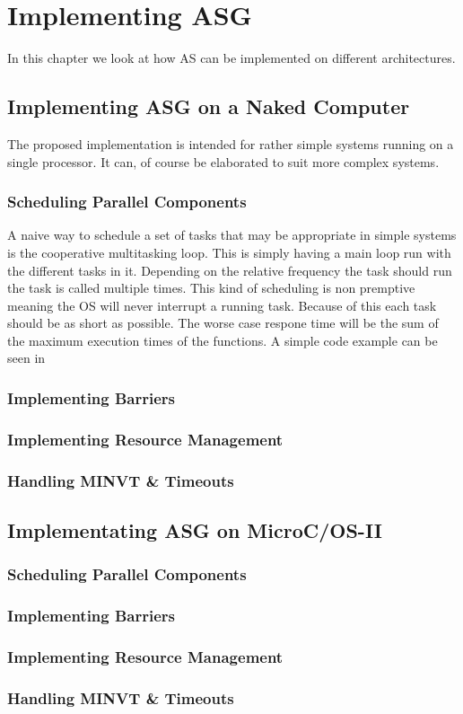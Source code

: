 \documentclass[../main.tex]{subfiles}
\begin{document}
\chapter{Implementing ASG}
In this chapter we look at how AS can be implemented on different architectures.

\section{Implementing ASG on a Naked Computer}
The proposed implementation is intended for rather simple systems running on a single processor. It can, of course be elaborated to suit more complex systems.
\subsection{Scheduling Parallel Components}
A naive way to schedule a set of tasks that may be appropriate in simple systems is the cooperative multitasking loop.
This is simply having a main loop run with the different tasks in it.
Depending on the relative frequency the task should run the task is called multiple times.
This kind of scheduling is non premptive meaning the OS will never interrupt a running task.
Because of this each task should be as short as possible.
The worse case respone time will be the sum of the maximum execution times of the functions.
A simple code example can be seen in 

%


\subsection{Implementing Barriers}
\subsection{Implementing Resource Management}
\subsection{Handling MINVT \& Timeouts}

\section{Implementating ASG on MicroC/OS-II}

\subsection{Scheduling Parallel Components}
\subsection{Implementing Barriers}
\subsection{Implementing Resource Management}
\subsection{Handling MINVT \& Timeouts}
\end{document}
